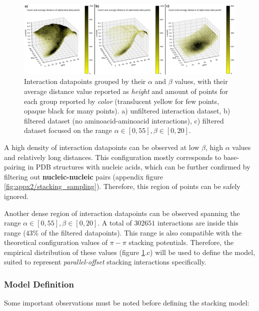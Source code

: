       \begin{figure}[H]
        \centering
        \includegraphics[width=1\textwidth]{figures/results/stacking_sampling.png}
        \caption{\label{fig:results/stacking_sampling} Interaction datapoints grouped by their $\alpha$ and $\beta$ values, with their average distance value reported as \textit{height} and amount of points for each group reported by \textit{color} (translucent yellow for few points, opaque black for many points). a) unfiltered interaction dataset, b) filtered dataset (no aminoacid-aminoacid interactions), c) filtered dataset focused on the range $\alpha \in [0,55], \beta \in [0,20]$.}
      \end{figure}

      A high density of interaction datapoints can be observed at low $\beta$, high $\alpha$ values and relatively long distances. This configuration mostly corresponds to base-pairing in PDB structures with nucleic acids, which can be further confirmed by filtering out \textbf{nucleic-nucleic} pairs (appendix figure \ref{fig:appx2/stacking_sampling}). Therefore, this region of points can be safely ignored.

      Another dense region of interaction datapoints can be observed spanning the range $\alpha \in [0,55], \beta \in [0,20]$. A total of $302651$ interactions are inside this range ($43 \%$ of the filtered datapoints). This range is also compatible with the theoretical configuration values of $\pi-\pi$ stacking potentials. Therefore, the empirical distribution of these values (figure \ref{fig:results/stacking_sampling}.c) will be used to define the model, suited to represent \textit{parallel-offset} stacking interactions specifically.

    \subsubsection{Model Definition}
      Some important observations must be noted before defining the stacking model:

